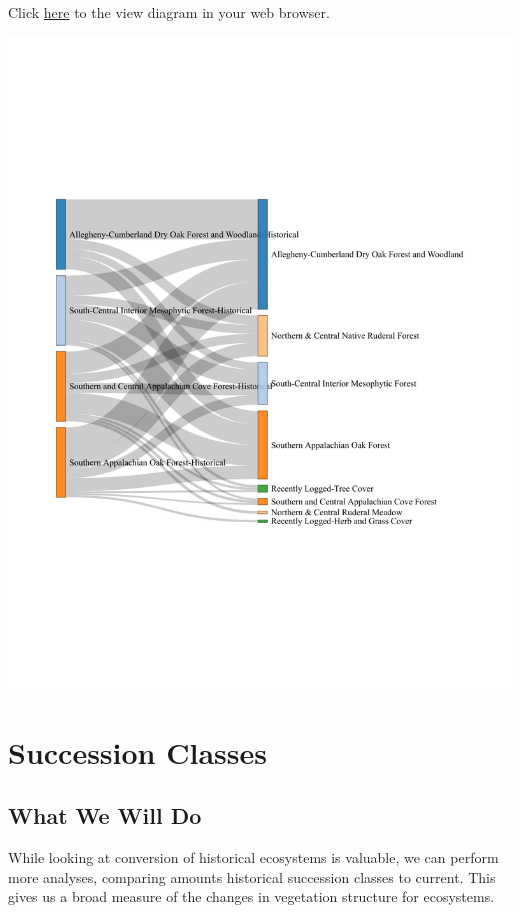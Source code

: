 \documentclass[
]{book}
\begin{document}
Click \href{https://rswaty.github.io/landfireFSC/sankey.html}{here} to the view diagram in your web browser.

\includegraphics{FSCBook_files/figure-latex/Atayasankey-1.pdf}

\hypertarget{successionClasses}{%
\chapter{Succession Classes}\label{successionClasses}}

\hypertarget{what-we-will-do}{%
\section{What We Will Do}\label{what-we-will-do}}

While looking at conversion of historical ecosystems is valuable, we can perform more analyses, comparing amounts historical succession classes to current. This gives us a broad measure of the changes in vegetation structure for ecosystems.
\end{document}
